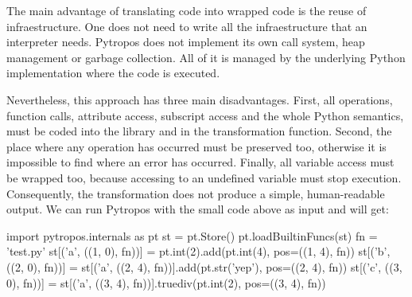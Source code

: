 \documentclass[
11pt, %
english, %
singlespacing, %
headsepline, %
]{MastersDoctoralThesis} %
\newenvironment{Shaded}{}{}
\newcommand{\BuiltInTok}[1]{#1}
\newcommand{\DecValTok}[1]{\textcolor[rgb]{0.25,0.63,0.44}{#1}}
\newcommand{\ImportTok}[1]{#1}
\newcommand{\NormalTok}[1]{#1}
\newcommand{\OperatorTok}[1]{\textcolor[rgb]{0.40,0.40,0.40}{#1}}
\newcommand{\StringTok}[1]{\textcolor[rgb]{0.25,0.44,0.63}{#1}}
\begin{document}
The main advantage of translating code into wrapped code is the reuse of
infraestructure. One does not need to write all the infraestructure that
an interpreter needs. Pytropos does not implement its own call system,
heap management or garbage collection. All of it is managed by the
underlying Python implementation where the code is executed.

Nevertheless, this approach has three main disadvantages. First, all
operations, function calls, attribute access, subscript access and the
whole Python semantics, must be coded into the library and in the
transformation function. Second, the place where any operation has
occurred must be preserved too, otherwise it is impossible to find where
an error has occurred. Finally, all variable access must be wrapped too,
because accessing to an undefined variable must stop execution.
Consequently, the transformation does not produce a simple,
human-readable output. We can run Pytropos with the small code above as
input and will get:

\begin{Shaded}
\begin{Highlighting}[]
\ImportTok{import}\NormalTok{ pytropos.internals }\ImportTok{as}\NormalTok{ pt}
\NormalTok{st }\OperatorTok{=}\NormalTok{ pt.Store()}
\NormalTok{pt.loadBuiltinFuncs(st)}
\NormalTok{fn }\OperatorTok{=} \StringTok{'test.py'}
\NormalTok{st[(}\StringTok{'a'}\NormalTok{, ((}\DecValTok{1}\NormalTok{, }\DecValTok{0}\NormalTok{), fn))] }\OperatorTok{=}\NormalTok{ pt.}\BuiltInTok{int}\NormalTok{(}\DecValTok{2}\NormalTok{).add(pt.}\BuiltInTok{int}\NormalTok{(}\DecValTok{4}\NormalTok{), pos}\OperatorTok{=}\NormalTok{((}\DecValTok{1}\NormalTok{, }\DecValTok{4}\NormalTok{), fn))}
\NormalTok{st[(}\StringTok{'b'}\NormalTok{, ((}\DecValTok{2}\NormalTok{, }\DecValTok{0}\NormalTok{), fn))] }\OperatorTok{=}\NormalTok{ st[(}\StringTok{'a'}\NormalTok{, ((}\DecValTok{2}\NormalTok{, }\DecValTok{4}\NormalTok{), fn))].add(pt.}\BuiltInTok{str}\NormalTok{(}\StringTok{'yep'}\NormalTok{), pos}\OperatorTok{=}\NormalTok{((}\DecValTok{2}\NormalTok{, }\DecValTok{4}\NormalTok{), fn))}
\NormalTok{st[(}\StringTok{'c'}\NormalTok{, ((}\DecValTok{3}\NormalTok{, }\DecValTok{0}\NormalTok{), fn))] }\OperatorTok{=}\NormalTok{ st[(}\StringTok{'a'}\NormalTok{, ((}\DecValTok{3}\NormalTok{, }\DecValTok{4}\NormalTok{), fn))].truediv(pt.}\BuiltInTok{int}\NormalTok{(}\DecValTok{2}\NormalTok{), pos}\OperatorTok{=}\NormalTok{((}\DecValTok{3}\NormalTok{, }\DecValTok{4}\NormalTok{), fn))}
\end{Highlighting}
\end{Shaded}
\end{document}
